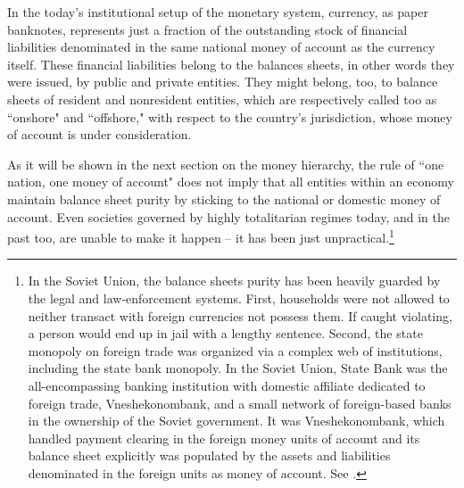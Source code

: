 In the today's institutional setup of the monetary system, currency, as
paper banknotes, represents just a fraction of the outstanding stock of
financial liabilities denominated in the same national money of account
as the currency itself. These financial liabilities belong to the
balances sheets, in other words they were issued, by public and private
entities. They might belong, too, to balance sheets of resident and
nonresident entities, which are respectively called too as ``onshore" and
``offshore," with respect to the country's jurisdiction, whose money of
account is under consideration.

As it will be shown in the next section on the money hierarchy, the rule
of ``one nation, one money of account" does not imply that all
entities within an economy maintain balance sheet purity by sticking to
the national or domestic money of account. Even societies governed
by highly totalitarian regimes today, and in the past too, are unable to
make it happen -- it has been just unpractical.\footnote{In the Soviet Union, the balance sheets purity has been heavily guarded by the legal and law-enforcement systems. First, households were not allowed to neither transact with foreign currencies not possess them. If caught violating, a person would end up in jail with a lengthy sentence. Second, the state monopoly on foreign trade was organized via a complex web of institutions, including the state bank monopoly. In the Soviet Union, State Bank was the all-encompassing banking institution with domestic affiliate dedicated to foreign trade, Vneshekonombank, and a small network of foreign-based banks in the ownership of the Soviet government. It was Vneshekonombank, which handled payment clearing in the foreign money units of account and its balance sheet explicitly was populated by the assets and liabilities denominated in the foreign units as money of account. See \citep{valchyshen_ru98}.}

